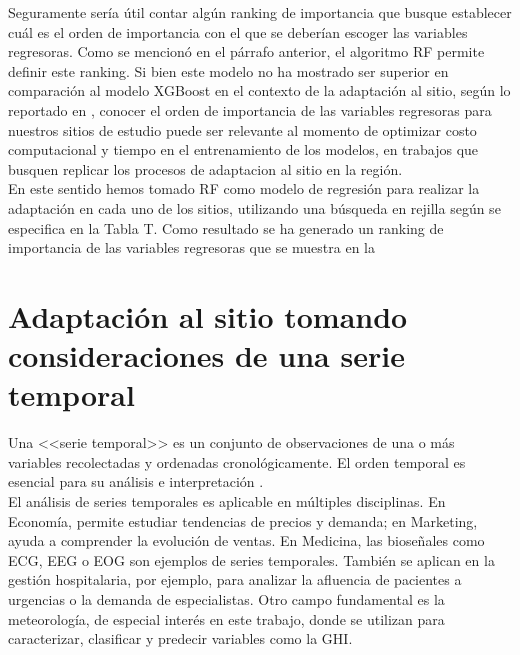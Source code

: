 Seguramente sería útil contar algún ranking de importancia que busque establecer cuál es el orden de importancia con el que se deberían escoger las variables regresoras. Como se mencionó en el párrafo anterior, el algoritmo RF permite definir este ranking. Si bien este modelo no ha mostrado ser superior en comparación al modelo XGBoost en el contexto de la adaptación al sitio, según lo reportado en \cite{SALAMALIKIS2022}, conocer el orden de importancia de las variables regresoras para nuestros sitios de estudio puede ser relevante al momento de optimizar costo computacional y tiempo en el entrenamiento de los modelos, en trabajos que busquen replicar los procesos de adaptacion al sitio en la región.\\


En este sentido hemos tomado RF como modelo de regresión para realizar la adaptación en cada uno de los sitios, utilizando una búsqueda en rejilla según se especifica en la Tabla T. Como resultado se ha generado un ranking de importancia de las variables regresoras que se muestra en la  




















\section{Adaptación al sitio tomando consideraciones de una serie temporal}

Una <<serie temporal>> es un conjunto de observaciones de una o más variables recolectadas y ordenadas cronológicamente. El orden temporal es esencial para su análisis e interpretación \cite{Olivas2022}.\\

El análisis de series temporales es aplicable en múltiples disciplinas. En Economía, permite estudiar tendencias de precios y demanda; en Marketing, ayuda a comprender la evolución de ventas. En Medicina, las bioseñales como ECG, EEG o EOG son ejemplos de series temporales. También se aplican en la gestión hospitalaria, por ejemplo, para analizar la afluencia de pacientes a urgencias o la demanda de especialistas. Otro campo fundamental es la meteorología, de especial interés en este trabajo, donde se utilizan para caracterizar, clasificar y predecir variables como la GHI.\\


